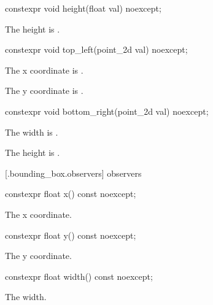 %
\begin{itemdecl}
constexpr void height(float val) noexcept;
\end{itemdecl}
\begin{itemdescr}
\pnum
\effects
The height is .
\end{itemdescr}

%
\begin{itemdecl}
constexpr void top_left(point_2d val) noexcept;
\end{itemdecl}
\begin{itemdescr}
\pnum
\effects
The x coordinate is .

\effects
The y coordinate is .
\end{itemdescr}

%
\begin{itemdecl}
constexpr void bottom_right(point_2d val) noexcept;
\end{itemdecl}
\begin{itemdescr}
\pnum
\effects
The width is .

\pnum
The height is .
\end{itemdescr}

 [\iotwod.bounding_box.observers]{ observers}

%
\begin{itemdecl}
constexpr float x() const noexcept;
\end{itemdecl}
\begin{itemdescr}
\pnum
\returns
The x coordinate.
\end{itemdescr}

%
\begin{itemdecl}
constexpr float y() const noexcept;
\end{itemdecl}
\begin{itemdescr}
\pnum
\returns
The y coordinate.
\end{itemdescr}

%
\begin{itemdecl}
constexpr float width() const noexcept;
\end{itemdecl}
\begin{itemdescr}
\pnum
\returns
The width.
\end{itemdescr}

